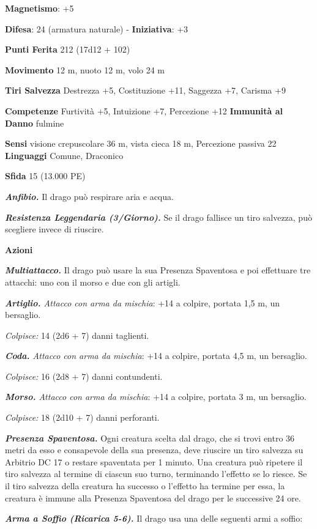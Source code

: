 \begin{multicols}{2}
\textbf{Magnetismo}: +5

\textbf{Difesa}: 24 (armatura naturale) - \textbf{Iniziativa}: +3

\textbf{Punti Ferita} 212 (17d12 + 102)

\textbf{Movimento} 12 m, nuoto 12 m, volo 24 m

\textbf{Tiri Salvezza} Destrezza +5, Costituzione +11, Saggezza +7,
Carisma +9

\textbf{Competenze} Furtività +5, Intuizione +7, Percezione +12
\textbf{Immunità al Danno} fulmine

\textbf{Sensi} visione crepuscolare 36 m, vista cieca 18 m, Percezione passiva
22 \textbf{Linguaggi} Comune, Draconico

\textbf{Sfida} 15 (13.000 PE)

\emph{\textbf{Anfibio.}} Il drago può respirare aria e acqua.

\emph{\textbf{Resistenza Leggendaria (3/Giorno).}} Se il drago fallisce
un tiro salvezza, può scegliere invece di riuscire.

\textbf{Azioni}

\emph{\textbf{Multiattacco.}} Il drago può usare la sua Presenza
Spaventosa e poi effettuare tre attacchi: uno con il morso e due con gli
artigli.

\emph{\textbf{Artiglio.} Attacco con arma da mischia}: +14 a colpire,
portata 1,5 m, un bersaglio.

\emph{Colpisce:} 14 (2d6 + 7) danni taglienti.

\emph{\textbf{Coda.} Attacco con arma da mischia}: +14 a colpire,
portata 4,5 m, un bersaglio.

\emph{Colpisce:} 16 (2d8 + 7) danni contundenti.

\emph{\textbf{Morso.} Attacco con arma da mischia}: +14 a colpire,
portata 3 m, un bersaglio.

\emph{Colpisce:} 18 (2d10 + 7) danni perforanti.

\emph{\textbf{Presenza Spaventosa.}} Ogni creatura scelta dal drago, che
si trovi entro 36 metri da esso e consapevole della sua presenza, deve
riuscire un tiro salvezza su Arbitrio DC 17 o restare spaventata per 1
minuto. Una creatura può ripetere il tiro salvezza al termine di ciascun
suo turno, terminando l'effetto se lo riesce. Se il tiro salvezza della
creatura ha successo o l'effetto ha termine per essa, la creatura è
immune alla Presenza Spaventosa del drago per le successive 24 ore.

\emph{\textbf{Arma a Soffio (Ricarica 5-6).}} Il drago usa una delle
seguenti armi a soffio:


\end{multicols}
